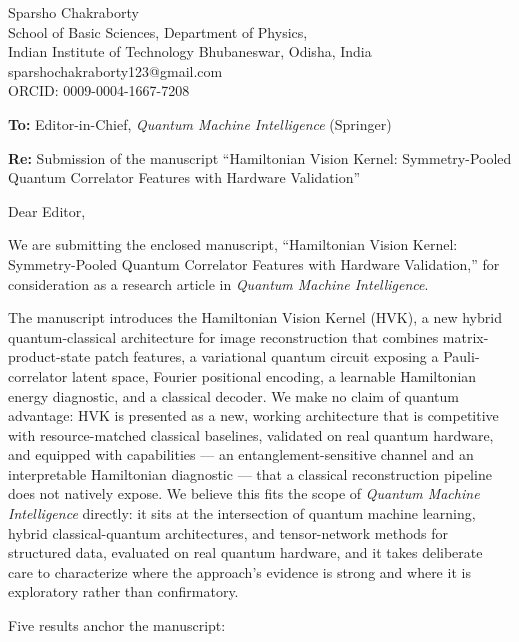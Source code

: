 \documentclass[11pt]{article}
\begin{document}
\begin{flushright}
Sparsho Chakraborty \\
School of Basic Sciences, Department of Physics, \\
Indian Institute of Technology Bhubaneswar, Odisha, India \\
sparshochakraborty123@gmail.com \\
ORCID: 0009-0004-1667-7208
\end{flushright}

\bigskip
\noindent \textbf{To:} Editor-in-Chief, \textit{Quantum Machine Intelligence} (Springer)

\bigskip
\noindent \textbf{Re:} Submission of the manuscript ``Hamiltonian Vision Kernel: Symmetry-Pooled Quantum Correlator Features with Hardware Validation''

\bigskip
\noindent Dear Editor,

\smallskip
\noindent We are submitting the enclosed manuscript, ``Hamiltonian Vision Kernel: Symmetry-Pooled Quantum Correlator Features with Hardware Validation,'' for consideration as a research article in \textit{Quantum Machine Intelligence}.

\smallskip
\noindent The manuscript introduces the Hamiltonian Vision Kernel (HVK), a new hybrid quantum-classical architecture for image reconstruction that combines matrix-product-state patch features, a variational quantum circuit exposing a Pauli-correlator latent space, Fourier positional encoding, a learnable Hamiltonian energy diagnostic, and a classical decoder. We make no claim of quantum advantage: HVK is presented as a new, working architecture that is competitive with resource-matched classical baselines, validated on real quantum hardware, and equipped with capabilities --- an entanglement-sensitive channel and an interpretable Hamiltonian diagnostic --- that a classical reconstruction pipeline does not natively expose. We believe this fits the scope of \textit{Quantum Machine Intelligence} directly: it sits at the intersection of quantum machine learning, hybrid classical-quantum architectures, and tensor-network methods for structured data, evaluated on real quantum hardware, and it takes deliberate care to characterize where the approach's evidence is strong and where it is exploratory rather than confirmatory.

\smallskip
\noindent Five results anchor the manuscript:
\end{document}
